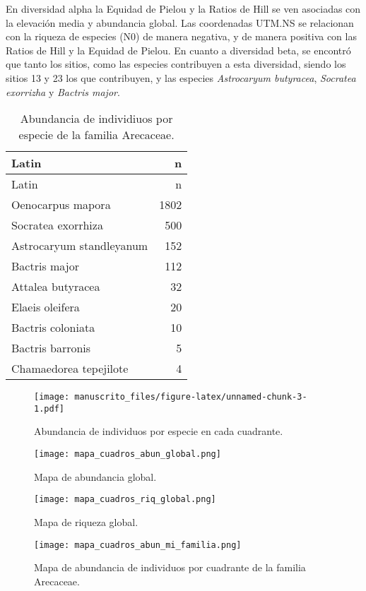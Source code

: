 \documentclass[11pt,]{article}
\begin{document}
En diversidad alpha la Equidad de Pielou y la Ratios de Hill se ven
asociadas con la elevación media y abundancia global. Las coordenadas
UTM.NS se relacionan con la riqueza de especies (N0) de manera negativa,
y de manera positiva con las Ratios de Hill y la Equidad de Pielou. En
cuanto a diversidad beta, se encontró que tanto los sitios, como las
especies contribuyen a esta diversidad, siendo los sitios 13 y 23 los
que contribuyen, y las especies \emph{Astrocaryum butyracea},
\emph{Socratea exorrizha} y \emph{Bactris major}.

\begin{longtable}[]{@{}lr@{}}
\caption{\label{tab:abun_sp}Abundancia de individiuos por especie de la
familia Arecaceae.}\tabularnewline
\toprule
Latin & n\tabularnewline
\midrule
\endfirsthead
\toprule
Latin & n\tabularnewline
\midrule
\endhead
Oenocarpus mapora & 1802\tabularnewline
Socratea exorrhiza & 500\tabularnewline
Astrocaryum standleyanum & 152\tabularnewline
Bactris major & 112\tabularnewline
Attalea butyracea & 32\tabularnewline
Elaeis oleifera & 20\tabularnewline
Bactris coloniata & 10\tabularnewline
Bactris barronis & 5\tabularnewline
Chamaedorea tepejilote & 4\tabularnewline
\bottomrule
\end{longtable}

\begin{figure}
\centering
\texttt{[image: manuscrito\_files/figure-latex/unnamed-chunk-3-1.pdf]}
\caption{\label{fig:abun_sp_q}Abundancia de individuos por especie en
cada cuadrante.}
\end{figure}

\begin{figure}
\centering
\texttt{[image: mapa\_cuadros\_abun\_global.png]}
\caption{Mapa de abundancia global.
\label{fig:mapa_cuadros_abun_global}}
\end{figure}

\begin{figure}
\centering
\texttt{[image: mapa\_cuadros\_riq\_global.png]}
\caption{Mapa de riqueza global. \label{fig:mapa_cuadros_riq_global}}
\end{figure}

\begin{figure}
\centering
\texttt{[image: mapa\_cuadros\_abun\_mi\_familia.png]}
\caption{Mapa de abundancia de individuos por cuadrante de la familia
Arecaceae. \label{fig:mapa_cuadros_abun_mi_familia}}
\end{figure}
\end{document}
